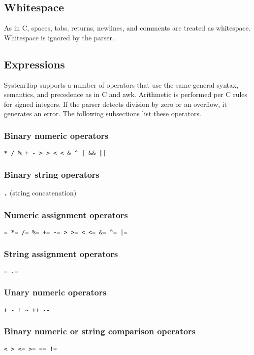 \documentclass[twoside,english]{article}
\begin{document}
\subsection{Whitespace}
As in C, spaces, tabs, returns, newlines, and comments are treated as whitespace.
Whitespace is ignored by the parser.


\subsection{Expressions}
SystemTap supports a number of operators that use the same general syntax,
semantics, and precedence as in C and awk. Arithmetic is performed per C
rules for signed integers. If the parser detects division by zero or an overflow,
it generates an error. The following subsections list these operators.


\subsubsection{Binary numeric operators}
\texttt{{*} / \% + - >\,{}> <\,{}< \& \textasciicircum{}
| \&\& ||}


\subsubsection{Binary string operators}
\texttt{\textbf{.}} (string concatenation)


\subsubsection{Numeric assignment operators}
\texttt{= {*}= /= \%= += -= >\,{}>= <\,{}<=
\&= \textasciicircum{}= |=}


\subsubsection{String assignment operators}

\texttt{= .=}


\subsubsection{Unary numeric operators}
\texttt{+ - ! \textasciitilde{} ++ -{}-}


\subsubsection{Binary numeric or string comparison operators}
\texttt{< > <= >= == !=}
\end{document}

